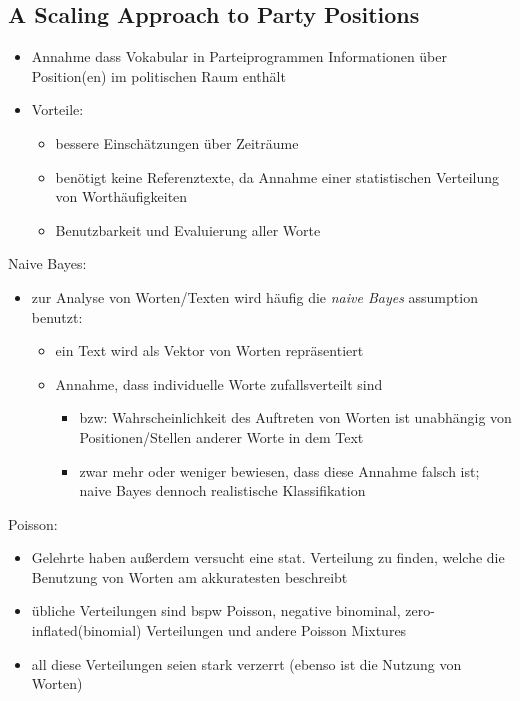 \documentclass[11pt]{article}
\begin{document}
\subsection{A Scaling Approach to Party Positions}
\label{sec:org9640c68}
\begin{itemize}
\item Annahme dass Vokabular in Parteiprogrammen Informationen über Position(en) im politischen Raum enthält
\item Vorteile:
\begin{itemize}
\item bessere Einschätzungen über Zeiträume
\item benötigt keine Referenztexte, da Annahme einer statistischen Verteilung von Worthäufigkeiten
\item Benutzbarkeit und Evaluierung aller Worte
\end{itemize}
\end{itemize}

Naive Bayes:
\begin{itemize}
\item zur Analyse von Worten/Texten wird häufig die \emph{naive Bayes} assumption benutzt:
\begin{itemize}
\item ein Text wird als Vektor von Worten repräsentiert
\item Annahme, dass individuelle Worte zufallsverteilt sind
\begin{itemize}
\item bzw: Wahrscheinlichkeit des Auftreten von Worten ist unabhängig von Positionen/Stellen anderer Worte in dem Text
\item zwar mehr oder weniger bewiesen, dass diese Annahme falsch ist; naive Bayes dennoch realistische Klassifikation
\end{itemize}
\end{itemize}
\end{itemize}

Poisson:
\begin{itemize}
\item Gelehrte haben außerdem versucht eine stat. Verteilung zu finden, welche die Benutzung von Worten am akkuratesten beschreibt
\item übliche Verteilungen sind bspw Poisson, negative binominal, zero-inflated(binomial) Verteilungen und andere Poisson Mixtures
\item all diese Verteilungen seien stark verzerrt (ebenso ist die Nutzung von Worten)
\end{itemize}
\end{document}
